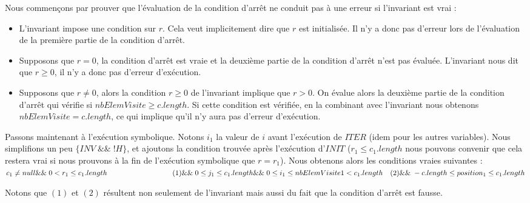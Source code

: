 	
	
	\begin{description}
		\item Nous commençons par prouver que l’évaluation de la condition d’arrêt ne conduit pas à une erreur si l’invariant est vrai :
		\begin{itemize}
			\item L’invariant impose une condition sur $r$. Cela veut implicitement dire que $r$ est initialisée. Il n’y a donc pas d’erreur lors de l’évaluation de la première partie de la condition d’arrêt.
			\item Supposons que $r=0$, la condition d’arrêt est vraie et la deuxième partie de la condition d’arrêt n’est pas évaluée. L’invariant nous dit que $r \geq 0$, il n’y a donc pas d’erreur d’exécution.
			\item Supposons que $r \neq 0$, alors la condition $r \geq 0$ de l’invariant implique que $r>0$. On évalue alors la deuxième partie de la condition d’arrêt qui vérifie si $nbElemVisite \geq c.length$. Si cette condition est vérifiée, en la combinant avec l’invariant nous obtenons $nbElemVisite = c.length$, ce qui implique qu’il n’y aura pas d’erreur d’exécution.
		\end{itemize}
	\end{description}		
	
	
	Passons maintenant à l’exécution symbolique. Notons $i_1$ la valeur de $i$ avant l’exécution de $ITER$ (idem pour les autres variables). Nous simplifions un peu $\{INV \;\&\&\; !H\}$, et ajoutons la condition trouvée après l’exécution d’$INIT$ ($r_1 \leq c_1.length$ nous pouvons convenir que cela restera vrai si nous prouvons à la fin de l’exécution symbolique que $r=r_1$). Nous obtenons alors les conditions vraies suivantes :	\\	
	
	
	$c_1 \neq null \\
	\&\&\; 0<r_1 \leq c_1.length\quad\quad\quad\quad\quad\quad\quad\quad\quad	      (1)\\
	\&\&\; 0 \leq j_1 \leq c_1.length\\
	\&\&\; 0 \leq i_1 \leq nbElemVisite1 < c_1.length \quad (2)\\
	\&\&\; -c.length \leq position_1 \leq c_1.length$
	

	Notons que $(1)$ et $(2)$ résultent non seulement de l’invariant mais aussi du fait que la condition d’arrêt est fausse.

